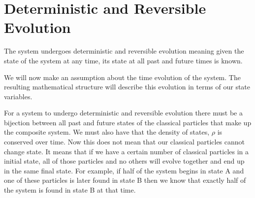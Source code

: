 \documentclass{article}[a4paper]
\begin{document}
\section{Deterministic and Reversible Evolution}

\begin{assump}
	The system undergoes deterministic and reversible evolution meaning given the state of the system at any time, its state at all past and future times is known.
\end{assump}

	We will now make an assumption about the time evolution of the system. The resulting mathematical structure will describe this evolution in terms of our state variables.

	For a system to undergo deterministic and reversible evolution there must be a bijection between all past and future states of the classical particles that make up the composite system. We must also have that the density of states, $\rho$ is conserved over time. Now this does not mean that our classical particles cannot change state. It means that if we have a certain number of classical particles in a initial state, all of those particles and no others will evolve together and end up in the same final state. For example, if half of the system begins in state A and one of these particles is later found in state B then we know that exactly half of the system is found in state B at that time.
	
\end{document}
